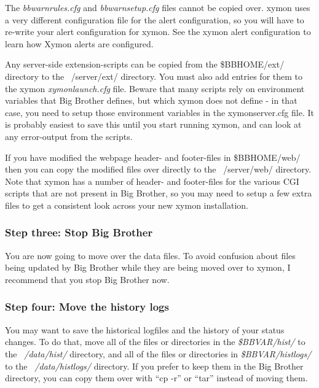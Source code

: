  The \emph{bbwarnrules.cfg}
 and \emph{bbwarnsetup.cfg} files cannot be copied over. xymon uses a
 very different configuration file for the alert configuration, so you
 will have to re-write your alert configuration for xymon. See the
 xymon alert configuration to learn how Xymon alerts are configured.


 Any server-side extension-scripts can be copied from the
 \$BBHOME/ext/ directory to the ~/server/ext/ directory. You must also
 add entries for them to the xymon \emph{xymonlaunch.cfg}
 file. Beware that many scripts rely on environment variables that Big
 Brother defines, but which xymon does not define - in that case, you
 need to setup those environment variables in the xymonserver.cfg
 file. It is probably easiest to save this until you start running
 xymon, and can look at any error-output from the scripts.



 If you have modified the webpage header- and footer-files in
 \$BBHOME/web/ then you can copy the modified files over directly to
 the ~/server/web/ directory. Note that xymon has a number of header-
 and footer-files for the various CGI scripts that are not present in
 Big Brother, so you may need to setup a few extra files to get a
 consistent look across your new xymon installation.


\subsubsection{Step three: Stop Big Brother}


 You are now going to move over the data files. To avoid confusion
 about files being updated by Big Brother while they are being moved
 over to xymon, I recommend that you stop Big Brother now.

\subsubsection{Step four: Move the history logs}


 You may want to save the historical logfiles and the history of your
 status changes. To do that, move all of the files or directories in
 the \emph{\$BBVAR/hist/} to the \emph{~/data/hist/} directory, and
 all of the files or directories in \emph{\$BBVAR/histlogs/} to the
 \emph{~/data/histlogs/}  directory. If you prefer to keep them in the
 Big Brother directory, you can copy them over with ``cp -r'' or
 ``tar'' instead of moving them.

